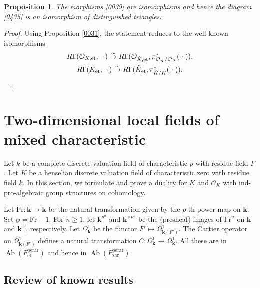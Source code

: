 \documentclass{amsart}
\newtheorem{Prop}[Thm]{Proposition}
\theoremstyle{remark}
\numberwithin{equation}{subsection}
\newcommand{\Order}{\mathcal{O}}
\newcommand{\isomto}{\overset{\sim}{\to}}
\newcommand{\et}{\mathrm{et}}
\newcommand{\zar}{\mathrm{zar}}
\newcommand{\perar}{\mathrm{perar}}
\newcommand{\alg}[1]{\mathbf{#1}}
\newcommand{\var}{\;\cdot\;}
\newcommand{\Frob}{\mathrm{Fr}}
\DeclareMathOperator{\Ab}{Ab}
\begin{document}
\begin{Prop} \label{0173}
	The morphisms \eqref{0039} are isomorphisms
	and hence the diagram \eqref{0435} is an isomorphism of distinguished triangles.
\end{Prop}

\begin{proof}
	Using Proposition \ref{0031},
	the statement reduces to the well-known isomorphisms
		\begin{gather*}
					R \Gamma(\Order_{K, \et}, \var)
				\isomto
					R \Gamma(
						\Order_{\Hat{K}, \et},
						\pi_{\Order_{\Hat{K}} / \Order_{K}}^{\ast}(\var)
					),
			\\
					R \Gamma(K_{\et}, \var)
				\isomto
					R \Gamma(
						\Hat{K}_{\et},
						\pi_{\Hat{K} / K}^{\ast}(\var)
					).
		\end{gather*}
\end{proof}


\section{Two-dimensional local fields of mixed characteristic}
\label{0174}

Let $k$ be a complete discrete valuation field of characteristic $p$ with residue field $F$.
Let $K$ be a henselian discrete valuation field of characteristic zero
with residue field $k$.
In this section, we formulate and prove a duality for $K$ and $\Order_{K}$
with ind-pro-algebraic group structures on cohomology.

Let $\Frob \colon \alg{k} \to \alg{k}$ be the natural transformation
given by the $p$-th power map on $\alg{k}$.
Set $\wp = \Frob - 1$.
For $n \ge 1$, let $\alg{k}^{p^{n}}$ and $\alg{k}^{\times p^{n}}$ be
the (presheaf) images of $\Frob^{n}$
on $\alg{k}$ and $\alg{k}^{\times}$, respectively.
Let $\Omega_{\alg{k}}^{1}$ be the functor $F' \mapsto \Omega_{\alg{k}(F')}^{1}$.
The Cartier operator on $\Omega_{\alg{k}(F')}^{1}$ defines a natural transformation
$C \colon \Omega_{\alg{k}}^{1} \to \Omega_{\alg{k}}^{1}$.
All these are in $\Ab(F^{\perar}_{\et})$ and hence in $\Ab(F^{\perar}_{\zar})$.


\subsection{Review of known results}
\label{0040}
\end{document}
